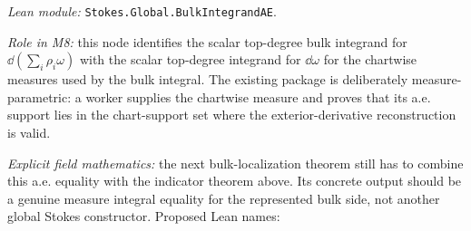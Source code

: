 \begin{theorem}
  \label{anc:m8_bulk_ae_equality}
  \leanok
  \emph{Lean module:} \texttt{Stokes.Global.BulkIntegrandAE}.

  \emph{Role in M8:}
  this node identifies the scalar top-degree bulk integrand for
  \(\dd(\sum_i \rho_i\omega)\) with the scalar top-degree integrand for
  \(\dd\omega\) for the chartwise measures used by the bulk integral.  The
  existing package is deliberately measure-parametric: a worker supplies the
  chartwise measure and proves that its a.e. support lies in the chart-support
  set where the exterior-derivative reconstruction is valid.

  \emph{Explicit field mathematics:}
  the next bulk-localization theorem still has to combine this a.e. equality
  with the indicator theorem above.  Its concrete output should be a genuine
  measure integral equality for the represented bulk side, not another global
  Stokes constructor.  Proposed Lean names:
\end{theorem}


